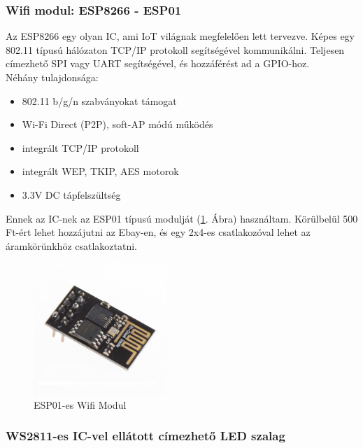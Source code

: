 \documentclass[../main.tex]{subfiles}
\begin{document}
        \subsubsection{Wifi modul: ESP8266 - ESP01} 
            Az ESP8266 egy olyan IC, ami IoT világnak\cite{a_iot} megfelelően lett tervezve. Képes egy 802.11 típusú hálózaton TCP/IP protokoll segítségével kommunikálni. Teljesen címezhető SPI vagy UART segítségével, és hozzáférést ad a GPIO-hoz.\cite{sec_201} \\[12px]
            Néhány tulajdonsága:
            \begin{itemize}
                \item 802.11 b/g/n szabványokat támogat
                \item Wi-Fi Direct (P2P), soft-AP módú működés
                \item integrált TCP/IP protokoll
                \item integrált WEP, TKIP, AES motorok
                \item 3.3V DC tápfelszültség
            \end{itemize}
            
            Ennek az IC-nek az ESP01 típusú modulját (\ref{fig:esp01}. Ábra) használtam. Körülbelül 500 Ft-ért lehet hozzájutni az Ebay-en, és egy 2x4-es csatlakozóval lehet az áramkörünkhöz csatlakoztatni.
            
            \begin{figure}[h!]
                \centering
                    \includegraphics[width=5cm]{resources/pcb_res/esp01.jpg}
                \caption{ESP01-es Wifi Modul\cite{sec_201}}
                \label{fig:esp01}
            \end{figure}
        
        \subsubsection{WS2811-es IC-vel ellátott címezhető LED szalag}
            
\end{document}
